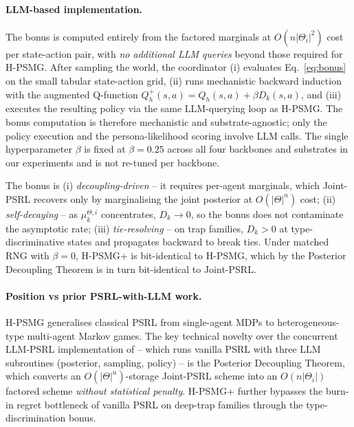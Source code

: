 ﻿\documentclass{article}
\def\textsuperscript#1{#1}%
\begin{document}
\paragraph{LLM-based implementation.} The bonus is computed entirely from the factored marginals at $O(n|\Theta_i|^2)$ cost per state-action pair, with \emph{no additional LLM queries} beyond those required for H-PSMG. After sampling the world, the coordinator (i) evaluates Eq.~\eqref{eq:bonus} on the small tabular state-action grid, (ii) runs mechanistic backward induction with the augmented Q-function $Q_h^+(s,a) = Q_h(s,a) + \beta D_k(s,a)$, and (iii) executes the resulting policy via the same LLM-querying loop as H-PSMG. The bonus computation is therefore mechanistic and substrate-agnostic; only the policy execution and the persona-likelihood scoring involve LLM calls. The single hyperparameter $\beta$ is fixed at $\beta{=}0.25$ across all four backbones and substrates in our experiments and is not re-tuned per backbone.

The bonus is (i) \emph{decoupling-driven} -- it requires per-agent marginals, which Joint-PSRL recovers only by marginalising the joint posterior at $O(|\Theta|^n)$ cost; (ii) \emph{self-decaying} -- as $\mu_k^{\Theta,i}$ concentrates, $D_k\!\to\!0$, so the bonus does not contaminate the asymptotic rate; (iii) \emph{tie-resolving} -- on trap families, $D_k\!>\!0$ at type-discriminative states and propagates backward to break ties. Under matched RNG with $\beta\!=\!0$, H-PSMG\textsuperscript{+} is bit-identical to H-PSMG, which by the Posterior Decoupling Theorem is in turn bit-identical to Joint-PSRL.

\paragraph{Position vs prior PSRL-with-LLM work.} H-PSMG generalises classical PSRL \citep{strens2000bayesian,osband2013more} from single-agent MDPs to heterogeneous-type multi-agent Markov games. The key technical novelty over the concurrent LLM-PSRL implementation of \citet{arumugam2026efficient} -- which runs vanilla PSRL with three LLM subroutines (posterior, sampling, policy) -- is the Posterior Decoupling Theorem, which converts an $O(|\Theta|^n)$-storage Joint-PSRL scheme into an $O(n|\Theta_i|)$ factored scheme \emph{without statistical penalty}. H-PSMG\textsuperscript{+} further bypasses the burn-in regret bottleneck of vanilla PSRL on deep-trap families through the type-discrimination bonus.
\end{document}

